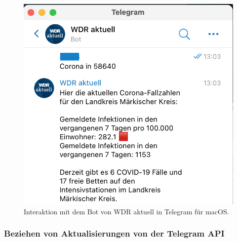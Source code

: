 \begin{figure}[h!]
\centering
\includegraphics[scale=0.7]{telegram-bot-beispiel}
\caption{Interaktion mit dem Bot von WDR aktuell in Telegram für macOS.}
\end{figure}

\subsubsection{Beziehen von Aktualisierungen von der Telegram API}
\label{sec:telegram-getting-updates}

